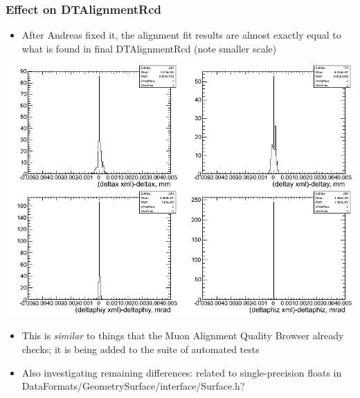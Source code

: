\documentclass[compress]{beamer}
\begin{document}
\begin{frame}
\frametitle{Effect on DTAlignmentRcd}
\begin{itemize}
\item After Andreas fixed it, the alignment fit results are almost
  exactly equal to what is found in final DTAlignmentRcd (note smaller scale)
\end{itemize}

\vspace{-0.3 cm}
\begin{center}
\includegraphics[width=0.65\linewidth]{delta_deltas__g6_with_andreas_bug_fix__05.png}
\end{center}

\vspace{-0.3 cm}
\begin{itemize}
\item This is {\it similar} to things that the Muon Alignment Quality
  Browser already checks; it is being added to the suite of automated tests
\item Also investigating remaining differences: related to
  single-precision floats in DataFormats/GeometrySurface/interface/Surface.h?
\end{itemize}
\end{frame}
\end{document}
